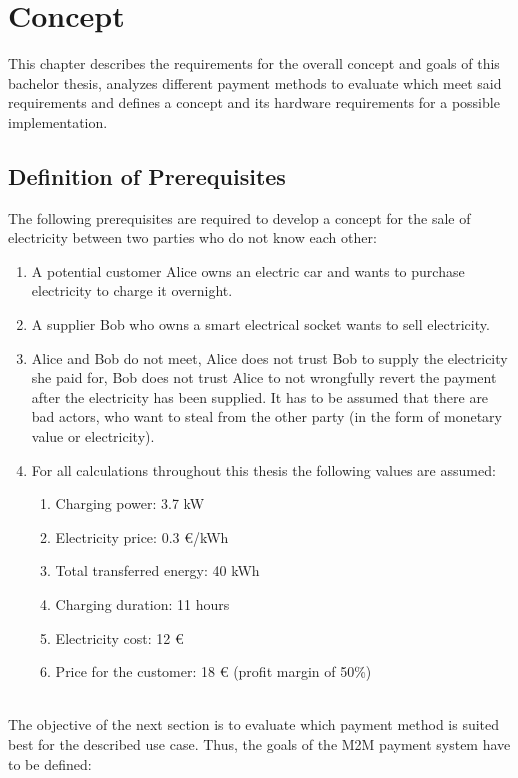 \section{Concept}
This chapter describes the requirements for the overall concept and goals of this bachelor thesis, analyzes different payment methods to evaluate which meet said requirements and defines a concept and its hardware requirements for a possible implementation.
\\
\subsection{Definition of Prerequisites}

The following prerequisites are required to develop a concept for the sale of electricity between two parties who do not know each other:
\begin{enumerate}
    \item A potential customer Alice owns an electric car and wants to purchase electricity to charge it overnight.
    \item A supplier Bob who owns a smart electrical socket wants to sell electricity.
    \item Alice and Bob do not meet, Alice does not trust Bob to supply the electricity she paid for, Bob does not trust Alice to not wrongfully revert the payment after the electricity has been supplied.
    It has to be assumed that there are bad actors, who want to steal from the other party (in the form of monetary value or electricity).
    \item For all calculations throughout this thesis the following values are assumed:
    \begin{enumerate}
        \item Charging power: 3.7 kW
        \item Electricity price: 0.3 \euro/kWh
        \item Total transferred energy: 40 kWh
        \item Charging duration: 11 hours
        \item Electricity cost: 12 \euro
        \item Price for the customer: 18 \euro{} (profit margin of 50\%)
    \end{enumerate}
\end{enumerate}
\leavevmode
\\
The objective of the next section is to evaluate which payment method is suited best for the described use case.
Thus, the goals of the M2M payment system have to be defined:


